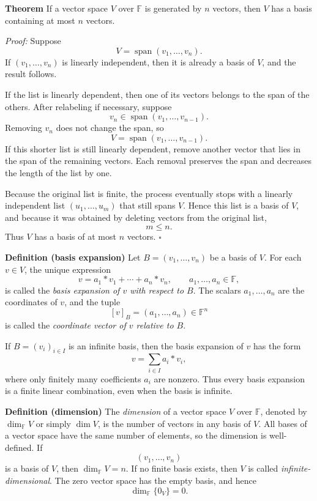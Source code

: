 \documentclass[a4paper,11pt,abstract=true]{scrartcl}
\theoremstyle{dotlessP}
\theoremstyle{dotlessS}
\theoremstyle{remark}
\theoremstyle{definition}
\begin{document}
\textbf{Theorem} If a vector space $V$ over $\mathbb{F}$ is generated by $n$
vectors, then $V$ has a basis containing at most $n$ vectors.

\textit{Proof:} Suppose
\[
V=\operatorname{span}(v_1,\ldots,v_n).
\]
If $(v_1,\ldots,v_n)$ is linearly independent, then it is already a basis of
$V$, and the result follows.

If the list is linearly dependent, then one of its vectors belongs to the
span of the others. After relabeling if necessary, suppose
\[
v_n\in\operatorname{span}(v_1,\ldots,v_{n-1}).
\]
Removing $v_n$ does not change the span, so
\[
V=\operatorname{span}(v_1,\ldots,v_{n-1}).
\]
If this shorter list is still linearly dependent, remove another vector that
lies in the span of the remaining vectors. Each removal preserves the span
and decreases the length of the list by one.

Because the original list is finite, the process eventually stops with a
linearly independent list $(u_1,\ldots,u_m)$ that still spans $V$. Hence this
list is a basis of $V$, and because it was obtained by deleting vectors from
the original list,
\[
m\leq n.
\]
Thus $V$ has a basis of at most $n$ vectors. \hfill$\square$

\textbf{Definition (basis expansion)} Let
$B=(v_1,\ldots,v_n)$ be a basis of $V$. For each $v\in V$, the unique
expression
\[
v=a_1*v_1+\cdots+a_n*v_n,
\qquad a_1,\ldots,a_n\in \mathbb{F},
\]
is called the \emph{basis expansion of $v$ with respect to $B$}. The scalars
$a_1,\ldots,a_n$ are the coordinates of $v$, and the tuple
\[
{[v]}_B=(a_1,\ldots,a_n)\in \mathbb{F}^n
\]
is called the \emph{coordinate vector of $v$ relative to $B$}.

If $B={(v_i)}_{i\in I}$ is an infinite basis, then the basis expansion of $v$
has the form
\[
v=\sum_{i\in I}a_i*v_i,
\]
where only finitely many coefficients $a_i$ are nonzero. Thus every basis
expansion is a finite linear combination, even when the basis is infinite.

\textbf{Definition (dimension)} The \emph{dimension} of a vector space $V$
over $\mathbb{F}$, denoted by $\dim_{\mathbb{F}} V$ or simply $\dim V$, is the number of vectors
in any basis of $V$. All bases of a vector space have the same number of
elements, so the dimension is well-defined. If
\[
(v_1,\ldots,v_n)
\]
is a basis of $V$, then $\dim_{\mathbb{F}} V=n$. If no finite basis exists, then $V$ is
called \emph{infinite-dimensional}. The zero vector space has the empty basis,
and hence
\[
\dim_{\mathbb{F}}\{0_V\}=0.
\]
\end{document}
